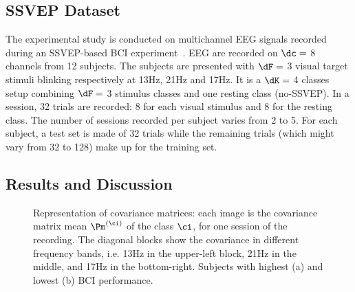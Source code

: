 {\subsection{SSVEP Dataset}
The experimental study is conducted on multichannel EEG signals recorded during an SSVEP-based BCI experiment~\cite{kalunga_hybrid_2014}.   
EEG are recorded on $\dc=$ 8 channels from 12 subjects.
The subjects are presented with $\dF=$ 3 visual target stimuli blinking respectively at 13Hz, 21Hz and 17Hz. %
It is a $\dK=$ 4 classes setup combining $\dF=$ 3 stimulus classes and one resting class (no-SSVEP).
In a session, 32 trials are recorded: 8 for each visual stimulus and 8 for the resting class. 
The number of sessions recorded per subject varies from 2 to 5.
For each subject, a test set is made of 32 trials while the remaining trials (which might vary from 32 to 128) make up for the training set.

\subsection{Results and Discussion}

\begin{figure}[h!]
\centering
{}
\caption{Representation of covariance matrices: each image is the covariance matrix mean $\Pm^{(\ci)}$ of the class $\ci$, for one session of the recording. The diagonal blocks show the covariance in different frequency bands, i.e. 13Hz in the upper-left block, 21Hz in the middle, and 17Hz in the bottom-right. Subjects with highest (a) and lowest (b) BCI performance. 
}
\label{fig:covmat}
\end{figure}

}

